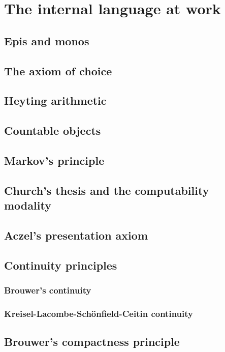 \chapter{The internal language at work}
\label{cha:internal-language-at}

\section{Epis and monos}
\label{sec:epis-monos}

\section{The axiom of choice}
\label{sec:axiom-choice}

\section{Heyting arithmetic}
\label{sec:heyting-arithmetic}

\section{Countable objects}
\label{sec:countable-objects}

\section{Markov's principle}
\label{sec:markovs-principle}

\section{Church's thesis and the computability modality}
\label{sec:church-thesis}

\section{Aczel's presentation axiom}
\label{sec:aczels-pres-axiom}

\section{Continuity principles}
\label{sec:cont-princ}

\subsection{Brouwer's continuity}
\label{sec:brouw-cont-princ}

\subsection{Kreisel-Lacombe-Schönfield-Ceitin continuity}
\label{sec:kreis-lacombe-schonf}

\section{Brouwer's compactness principle}
\label{sec:comp-princ}



